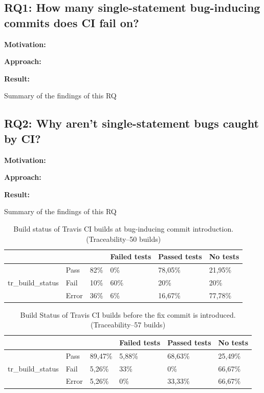 \documentclass[10pt,conference]{IEEEtran}
\newcommand{\conclusion}[1]{\begin{center}\begin{tcolorbox}[skin=widget, left=0.5mm,right=0.5mm,top=0.5mm,bottom=0.5mm,boxrule=0.3mm,arc=0mm,coltitle=black,colframe=black!99!white,colback=white!88!gray,width=(\linewidth),before=\hfill,after=\hfill]#1\end{tcolorbox}\end{center}}
\newcommand{\rqi}{RQ1:  How many single-statement bug-inducing commits does CI fail on?}
\newcommand{\rqii}{RQ2: Why aren't single-statement bugs caught by CI?}
\begin{document}
\subsection*{\rqi}

\noindent\textbf{Motivation:}

\noindent\textbf{Approach:}

\noindent\textbf{Result:}

\conclusion{Summary of the findings of this RQ}

\subsection*{\rqii}

\noindent\textbf{Motivation:}


\noindent\textbf{Approach:}


\noindent\textbf{Result:}

\conclusion{Summary of the findings of this RQ}

\begin{table}[t]
\centering
\begin{tabular}{lll|lll}
\hline
\multicolumn{3}{l|}{}                                      & Failed tests & Passed tests & No tests \\ \hline
\multirow{3}{*}{tr\_build\_status} & Pass  & 82\% & 0\%          & 78,05\%      & 21,95\%  \\
                                            & Fail  & 10\% & 60\%         & 20\%         & 20\%     \\
                                            & Error & 36\% & 6\%          & 16,67\%      & 77,78\%  \\ \hline
\end{tabular}
\caption{Build status of Travis CI builds at bug-inducing commit introduction. \\ (Traceability--50 builds)}
\label{tab:bugintro}
\end{table}

\begin{table}[t]
\centering
\begin{tabular}{lll|lll}
\hline
\multicolumn{3}{l|}{}                                & Failed tests & Passed tests & No tests \\ \hline
\multirow{3}{*}{tr\_build\_status} & Pass  & 89,47\% & 5,88\%       & 68,63\%      & 25,49\%  \\
                                   & Fail  & 5,26\%  & 33\%         & 0\%          & 66,67\%  \\
                                   & Error & 5,26\%  & 0\%          & 33,33\%      & 66,67\%  \\ \hline
\end{tabular}
\caption{Build Status of Travis CI builds before the fix commit is introduced. \\ (Traceability--57 builds)}
\label{tab:beforefix}
\end{table}
\end{document}
